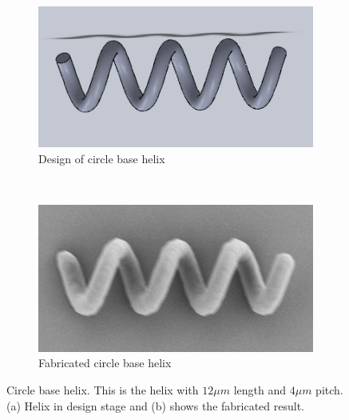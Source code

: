 \documentclass[12pt,a4paper,titlepage]{report}
\begin{document}
\begin{figure}
        \centering
        \begin{subfigure}[b]{0.50\textwidth}
                \includegraphics[width=\textwidth]{simpleHelixSolid}
                \caption{Design of circle base helix}
                \label{simpleHelixSolid}
        \end{subfigure}~
       \begin{subfigure}[b]{0.48\textwidth}
                \includegraphics[width=\textwidth]{CircleBase}
                \caption{Fabricated circle base helix}
                \label{CircleBase}
        \end{subfigure}
        \caption[Circle base helix]{Circle base helix. This is the helix with $12 \mu m$  length and $4\mu m$ pitch. (a) Helix in design
stage and (b) shows the fabricated result.}\label{Circle base helix}

       

\end{figure}
\end{document}
